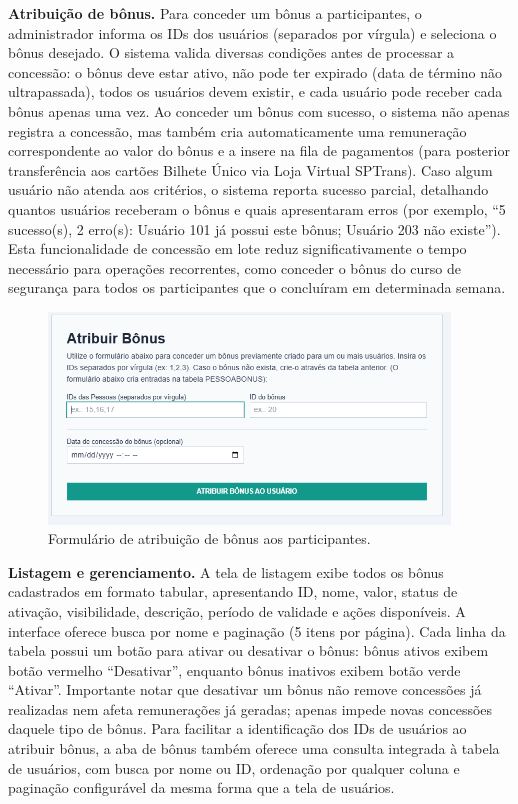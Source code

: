 \textbf{Atribuição de bônus.} Para conceder um bônus a participantes, o
administrador informa os IDs dos usuários (separados por vírgula) e seleciona o
bônus desejado. O sistema valida diversas condições antes de processar a
concessão: o bônus deve estar ativo, não pode ter expirado (data de término não
ultrapassada), todos os usuários devem existir, e cada usuário pode receber cada
bônus apenas uma vez. Ao conceder um bônus com sucesso, o sistema não apenas registra a concessão, mas
também cria automaticamente uma remuneração correspondente ao valor do bônus e a
insere na fila de pagamentos (para posterior transferência aos cartões Bilhete
Único via Loja Virtual SPTrans). Caso algum usuário não atenda aos critérios, o
sistema reporta sucesso parcial, detalhando quantos usuários receberam o bônus e
quais apresentaram erros (por exemplo, ``5 sucesso(s), 2 erro(s): Usuário 101 já
possui este bônus; Usuário 203 não existe''). Esta funcionalidade de concessão em
lote reduz significativamente o tempo necessário para operações recorrentes, como
conceder o bônus do curso de segurança para todos os participantes que o
concluíram em determinada semana.

 \begin{figure}[H]
   \centering
   \includegraphics[width=0.95\textwidth]{figuras/atribuir_bonus.PNG}
   \caption{Formulário de atribuição de bônus aos participantes.}
   \label{fig:bonus_atribuir_form}
 \end{figure}

\textbf{Listagem e gerenciamento.} A tela de listagem exibe todos os bônus
cadastrados em formato tabular, apresentando ID, nome, valor, status de ativação,
visibilidade, descrição, período de validade e ações disponíveis. A interface
oferece busca por nome e paginação (5 itens por página). Cada linha da tabela
possui um botão para ativar ou desativar o bônus: bônus ativos exibem
botão vermelho ``Desativar'', enquanto bônus inativos exibem botão verde
``Ativar''. Importante notar que desativar um bônus não remove concessões já
realizadas nem afeta remunerações já geradas; apenas impede novas concessões
daquele tipo de bônus. Para facilitar a identificação dos IDs de usuários ao
atribuir bônus, a aba de bônus também oferece uma consulta integrada à tabela de
usuários, com busca por nome ou ID, ordenação por qualquer coluna e
paginação configurável da mesma forma que a tela de usuários.


